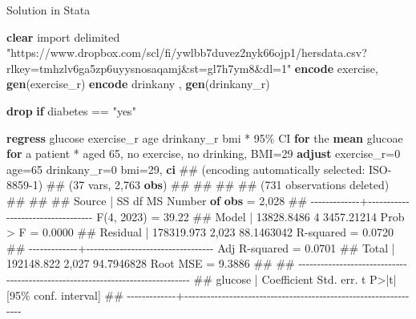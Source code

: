 \documentclass[
  letterpaper,
  DIV=11,
  numbers=noendperiod]{scrreprt}
\newenvironment{Shaded}{\begin{snugshade}}{\end{snugshade}}
\newcommand{\FunctionTok}[1]{\textcolor[rgb]{0.28,0.35,0.67}{#1}}
\newcommand{\KeywordTok}[1]{\textcolor[rgb]{0.00,0.23,0.31}{\textbf{#1}}}
\newcommand{\NormalTok}[1]{\textcolor[rgb]{0.00,0.23,0.31}{#1}}
\newcommand{\StringTok}[1]{\textcolor[rgb]{0.13,0.47,0.30}{#1}}
\begin{document}
Solution in Stata

\begin{Shaded}
\begin{Highlighting}[]
\KeywordTok{clear}
\NormalTok{import delimited }\StringTok{"https://www.dropbox.com/scl/fi/ywlbb7duvez2nyk66ojp1/hersdata.csv?rlkey=tmhzlv6ga5zp6uyysnosaqamj\&st=gl7h7ym8\&dl=1"}
\KeywordTok{encode}\NormalTok{  exercise, }\KeywordTok{gen}\NormalTok{(exercise\_r)}
\KeywordTok{encode}\NormalTok{ drinkany , }\KeywordTok{gen}\NormalTok{(drinkany\_r)}

\KeywordTok{drop} \KeywordTok{if}\NormalTok{ diabetes == }\StringTok{"yes"}

\KeywordTok{regress}\NormalTok{ glucose exercise\_r age drinkany\_r bmi }
\NormalTok{* 95\% CI }\KeywordTok{for}\NormalTok{ the }\KeywordTok{mean}\NormalTok{ glucoae }\KeywordTok{for}\NormalTok{ a patient}
\NormalTok{* aged 65, no exercise, no drinking, BMI=29}
\KeywordTok{adjust}\NormalTok{ exercise\_r=0 age=65 drinkany\_r=0 bmi=29, }\KeywordTok{ci}
\NormalTok{\#\# (encoding automatically selected: ISO{-}8859{-}1)}
\NormalTok{\#\# (37 vars, 2,763 }\KeywordTok{obs}\NormalTok{)}
\NormalTok{\#\# }
\NormalTok{\#\# }
\NormalTok{\#\# }
\NormalTok{\#\# (731 observations deleted)}
\NormalTok{\#\# }
\NormalTok{\#\# }
\NormalTok{\#\#       Source |       SS           df       MS      Number }\KeywordTok{of} \KeywordTok{obs}\NormalTok{   =     2,028}
\NormalTok{\#\# {-}{-}{-}{-}{-}{-}{-}{-}{-}{-}{-}{-}{-}+{-}{-}{-}{-}{-}{-}{-}{-}{-}{-}{-}{-}{-}{-}{-}{-}{-}{-}{-}{-}{-}{-}{-}{-}{-}{-}{-}{-}{-}{-}{-}{-}{-}{-}   }\FunctionTok{F}\NormalTok{(4, 2023)      =     39.22}
\NormalTok{\#\#        Model |  13828.8486         4  3457.21214   Prob \textgreater{} }\FunctionTok{F}\NormalTok{        =    0.0000}
\NormalTok{\#\#     Residual |  178319.973     2,023  88.1463042   R{-}squared       =    0.0720}
\NormalTok{\#\# {-}{-}{-}{-}{-}{-}{-}{-}{-}{-}{-}{-}{-}+{-}{-}{-}{-}{-}{-}{-}{-}{-}{-}{-}{-}{-}{-}{-}{-}{-}{-}{-}{-}{-}{-}{-}{-}{-}{-}{-}{-}{-}{-}{-}{-}{-}{-}   Adj R{-}squared   =    0.0701}
\NormalTok{\#\#        Total |  192148.822     2,027  94.7946828   Root MSE        =    9.3886}
\NormalTok{\#\# }
\NormalTok{\#\# {-}{-}{-}{-}{-}{-}{-}{-}{-}{-}{-}{-}{-}{-}{-}{-}{-}{-}{-}{-}{-}{-}{-}{-}{-}{-}{-}{-}{-}{-}{-}{-}{-}{-}{-}{-}{-}{-}{-}{-}{-}{-}{-}{-}{-}{-}{-}{-}{-}{-}{-}{-}{-}{-}{-}{-}{-}{-}{-}{-}{-}{-}{-}{-}{-}{-}{-}{-}{-}{-}{-}{-}{-}{-}{-}{-}{-}{-}}
\NormalTok{\#\#      glucose | Coefficient  Std. err.      t    P\textgreater{}|t|     [95\% conf. interval]}
\NormalTok{\#\# {-}{-}{-}{-}{-}{-}{-}{-}{-}{-}{-}{-}{-}+{-}{-}{-}{-}{-}{-}{-}{-}{-}{-}{-}{-}{-}{-}{-}{-}{-}{-}{-}{-}{-}{-}{-}{-}{-}{-}{-}{-}{-}{-}{-}{-}{-}{-}{-}{-}{-}{-}{-}{-}{-}{-}{-}{-}{-}{-}{-}{-}{-}{-}{-}{-}{-}{-}{-}{-}{-}{-}{-}{-}{-}{-}{-}{-}}

\end{Highlighting}
\end{Shaded}
\end{document}
